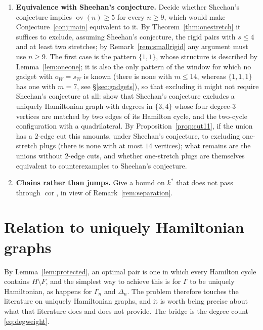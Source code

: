 \documentclass[11pt,a4paper]{article}
\theoremstyle{definition}
\theoremstyle{remark}
\newcommand{\ov}{\operatorname{ov}}
\newcommand{\cor}{\operatorname{cor}}
\begin{document}
\begin{enumerate}
\item \textbf{Equivalence with Sheehan's conjecture.} Decide whether Sheehan's conjecture implies $\ov(n)\ge5$ for every $n\ge9$, which would make Conjecture~\ref{conj:main} equivalent to it. By Theorem~\ref{thm:onestretch} it suffices to exclude, assuming Sheehan's conjecture, the rigid pairs with $s\le4$ and at least two stretches; by Remark~\ref{rem:smallrigid} any argument must use $n\ge9$. The first case is the pattern $\{1,1\}$, whose structure is described by Lemma~\ref{lem:oneone}; it is also the only pattern of the window for which no gadget with $o_W=s_W$ is known (there is none with $m\le14$, whereas $\{1,1,1\}$ has one with $m=7$, see \S\ref{sec:gadgets}), so that excluding it might not require Sheehan's conjecture at all: show that Sheehan's conjecture excludes a uniquely Hamiltonian graph with degrees in $\{3,4\}$ whose four degree-$3$ vertices are matched by two edges of its Hamilton cycle, and the two-cycle configuration with a quadrilateral. By Proposition~\ref{prop:cut11}, if the union has a $2$-edge cut this amounts, under Sheehan's conjecture, to excluding one-stretch plugs (there is none with at most $14$ vertices); what remains are the unions without $2$-edge cuts, and whether one-stretch plugs are themselves equivalent to counterexamples to Sheehan's conjecture.
\item \textbf{Chains rather than jumps.} Give a bound on $k^*$ that does not pass through $\cor$, in view of Remark~\ref{rem:separation}.
\end{enumerate}

\section{Relation to uniquely Hamiltonian graphs}\label{sec:uh}

By Lemma~\ref{lem:protected}, an optimal pair is one in which every Hamilton cycle contains $H\setminus F$, and the simplest way to achieve this is for $\Gamma$ to be uniquely Hamiltonian, as happens for $\Gamma_n$ and $\Delta_n$. The problem therefore touches the literature on uniquely Hamiltonian graphs, and it is worth being precise about what that literature does and does not provide. The bridge is the degree count \eqref{eq:degweight}.
\end{document}
